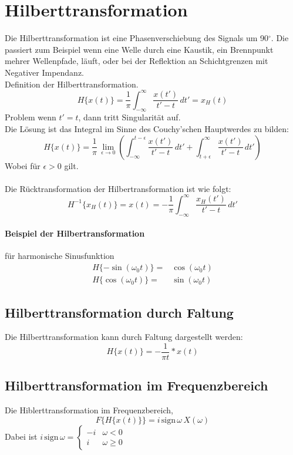 \section{Hilberttransformation}
Die Hilberttransformation ist eine Phasenverschiebung des Signals um 90$^\circ$. Die passiert zum Beispiel wenn eine Welle durch eine Kaustik, ein Brennpunkt mehrer Wellenpfade, läuft, oder bei der Reflektion an Schichtgrenzen mit Negativer Impendanz.\\
Definition der Hilberttransformation.
\begin{equation}
H\{x(t)\} = \frac{1}{\pi} \int_{-\infty}^\infty \frac{x(t')}{t'-t}\,dt' = x_H(t)
\end{equation}
Problem wenn $t'=t$, dann tritt Singularität auf.\\
Die Lösung ist das Integral im Sinne des Couchy'schen Hauptwerdes zu bilden:
\begin{equation}
H\{x(t)\} = \frac{1}{\pi}\,\lim_{\epsilon \rightarrow 0} \left(\int_{-\infty}^{t-\epsilon} \frac{x(t')}{t'-t}\,dt' + \int_{t+\epsilon}^{\infty} \frac{x(t')}{t'-t}\,dt' \right)
\end{equation}
Wobei für $\epsilon > 0$ gilt.\\\\
Die Rücktransformation der Hilbertransformation ist wie folgt:
\begin{equation}
H^{-1}\{x_H(t)\} = x(t) = -\frac{1}{\pi} \int_{-\infty}^\infty \frac{x_H(t')}{t'-t}\,dt'
\end{equation}

\paragraph{Beispiel der Hilbertransformation} für harmonische Sinusfunktion
\[
\begin{split}
H\{-\sin (\omega_0t)\} = & \cos (\omega_0 t)\\
H\{\cos (\omega_0t)\} = & \sin (\omega_0 t)
\end{split}
\]

\subsection*{Hilberttransformation durch Faltung}
Die Hilberttransformation kann durch Faltung dargestellt werden:
\[
H\{x(t)\} = -\frac{1}{\pi t} * x(t)
\]

\subsection*{Hilberttransformation im Frequenzbereich}
Die Hiblerttransformation im Frequenzbereich,
\[
F\{H\{x(t)\}\} = i\,\mbox{sign}\,\omega\,X(\omega)
\]
Dabei ist $i\,\mbox{sign}\,\omega = 
\begin{cases}
-i & \omega < 0\\
i & \omega \geq 0
\end{cases}$

